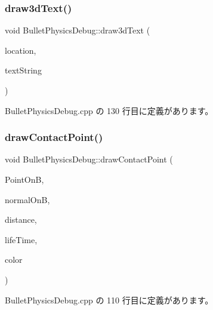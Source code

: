 \subsubsection{\texorpdfstring{draw3d\+Text()}{draw3dText()}}
{\footnotesize\ttfamily void Bullet\+Physics\+Debug\+::draw3d\+Text (\begin{DoxyParamCaption}\item[{const bt\+Vector3 \&}]{location,  }\item[{const char $\ast$}]{text\+String }\end{DoxyParamCaption})\hspace{0.3cm}{\ttfamily [override]}}



 Bullet\+Physics\+Debug.\+cpp の 130 行目に定義があります。

\mbox{\label{class_bullet_physics_debug_aa895e20c63340cb995693d3ad8f71a19}} 
\subsubsection{\texorpdfstring{draw\+Contact\+Point()}{drawContactPoint()}}
{\footnotesize\ttfamily void Bullet\+Physics\+Debug\+::draw\+Contact\+Point (\begin{DoxyParamCaption}\item[{const bt\+Vector3 \&}]{Point\+OnB,  }\item[{const bt\+Vector3 \&}]{normal\+OnB,  }\item[{bt\+Scalar}]{distance,  }\item[{int}]{life\+Time,  }\item[{const bt\+Vector3 \&}]{color }\end{DoxyParamCaption})\hspace{0.3cm}{\ttfamily [override]}}



 Bullet\+Physics\+Debug.\+cpp の 110 行目に定義があります。

\mbox{\label{class_bullet_physics_debug_ad2602a90645ab868f8b3aafc98be7109}} 
